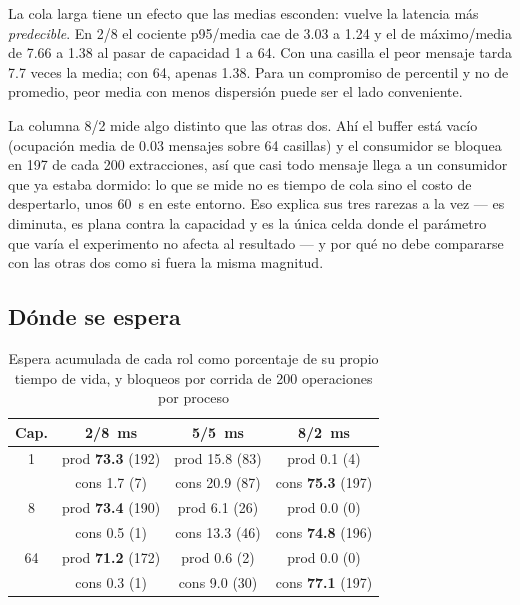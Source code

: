 La cola larga tiene un efecto que las medias esconden: vuelve la latencia
más \emph{predecible}. En 2/8 el cociente p95/media cae de 3.03 a 1.24 y el
de máximo/media de 7.66 a 1.38 al pasar de capacidad 1 a 64. Con una casilla
el peor mensaje tarda 7.7 veces la media; con 64, apenas 1.38. Para un
compromiso de percentil y no de promedio, peor media con menos dispersión
puede ser el lado conveniente.

La columna 8/2 mide algo distinto que las otras dos. Ahí el buffer está
vacío (ocupación media de 0.03 mensajes sobre 64 casillas) y el consumidor
se bloquea en 197 de cada 200 extracciones, así que casi todo mensaje llega
a un consumidor que ya estaba dormido: lo que se mide no es tiempo de cola
sino el costo de despertarlo, unos 60~\textmu s en este entorno. Eso explica
sus tres rarezas a la vez --- es diminuta, es plana contra la capacidad y es
la única celda donde el parámetro que varía el experimento no afecta al
resultado --- y por qué no debe compararse con las otras dos como si fuera
la misma magnitud.




\subsection{Dónde se espera}

\begin{table}[!t]
\caption{Espera acumulada de cada rol como porcentaje de su propio tiempo de
vida, y bloqueos por corrida de 200 operaciones por proceso}
\label{tab:esperas}
\centering
\small
\begin{tabular}{@{}cccc@{}}
\toprule
Cap. & 2/8~ms & 5/5~ms & 8/2~ms \\
\midrule
1  & prod \textbf{73.3} (192) & prod 15.8 (83) & prod 0.1 (4) \\
   & cons 1.7 (7)             & cons 20.9 (87) & cons \textbf{75.3} (197) \\
8  & prod \textbf{73.4} (190) & prod 6.1 (26)  & prod 0.0 (0) \\
   & cons 0.5 (1)             & cons 13.3 (46) & cons \textbf{74.8} (196) \\
64 & prod \textbf{71.2} (172) & prod 0.6 (2)   & prod 0.0 (0) \\
   & cons 0.3 (1)             & cons 9.0 (30)  & cons \textbf{77.1} (197) \\
\bottomrule
\end{tabular}
\end{table}

